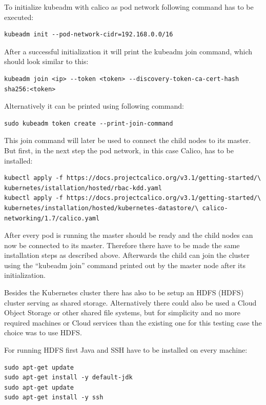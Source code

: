To initialize kubeadm with calico as pod network following command has to be executed:
\begin{lstlisting}[caption={Initialize Kubernetes master},captionpos=b]
kubeadm init --pod-network-cidr=192.168.0.0/16
\end{lstlisting}
After a successful initialization it will print the kubeadm join command, which should look similar to this:
\begin{lstlisting}[caption={Kubernetes join command},captionpos=b]
kubeadm join <ip> --token <token> --discovery-token-ca-cert-hash sha256:<token>
\end{lstlisting}
Alternatively it can be printed using following command:
\begin{lstlisting}[caption={Kubernetes print join command},captionpos=b]
sudo kubeadm token create --print-join-command 
\end{lstlisting}
This join command will later be used to connect the child nodes to its master. But first, in the next step the pod network, in this case Calico, has to be installed:
\begin{lstlisting}[caption={Install pod network for Kubernetes cluster},captionpos=b]
kubectl apply -f https://docs.projectcalico.org/v3.1/getting-started/\ kubernetes/istallation/hosted/rbac-kdd.yaml
kubectl apply -f https://docs.projectcalico.org/v3.1/getting-started/\ kubernetes/installation/hosted/kubernetes-datastore/\ calico-networking/1.7/calico.yaml
\end{lstlisting}

After every pod is running the master should be ready and the child nodes can now be connected to its master. Therefore there have to be made the same installation steps as described above. Afterwards the child can join the cluster using the ``kubeadm join'' command printed out by the master node after its initialization.

Besides the Kubernetes cluster there has also to be setup an \acs{HDFS} (\acl{HDFS}) cluster serving as shared storage. Alternatively there could also be used a Cloud Object Storage or other shared file systems, but for simplicity and no more required machines or Cloud services than the existing one for this testing case the choice was to use HDFS.

For running HDFS first Java and \acs{SSH} have to be installed on every machine:
\begin{lstlisting}[caption={HDFS requirements installation},captionpos=b]
sudo apt-get update
sudo apt-get install -y default-jdk
sudo apt-get update
sudo apt-get install -y ssh
\end{lstlisting}

